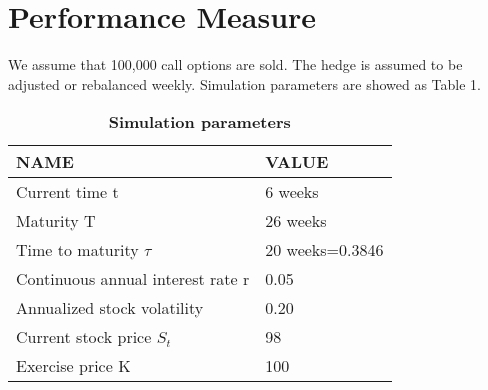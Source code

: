 \documentclass{article}
\begin{document}
\section*{Performance Measure}

We assume that 100,000 call options are sold. The hedge is assumed to be adjusted or rebalanced weekly. Simulation parameters are showed as Table 1.
\begin{table}[!htbp]
\centering
\caption{\bfseries   Simulation parameters}
\begin{tabular}{|l|l|}
\hline
NAME                              & VALUE \\
\hline
Current time t                    & 6 weeks \\
\hline
Maturity T                        & 26 weeks \\
\hline
Time to maturity $\tau$           & 20 weeks=0.3846 \\
\hline
Continuous annual interest rate r & 0.05 \\
\hline
Annualized stock volatility       & 0.20 \\
\hline
Current stock price $S_{t}$       & 98 \\
\hline
Exercise price K                  & 100 \\
\hline
\end{tabular}
\end{table}
\end{document}
